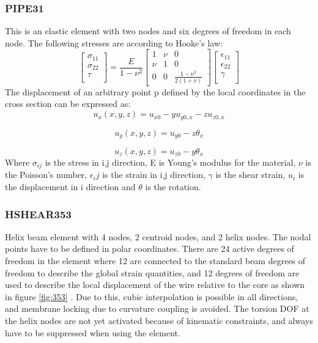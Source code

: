 \subsubsection{PIPE31}
This is an elastic element with two nodes and six degrees of freedom in each node. The following stresses are according to Hooke's law:
\begin{equation}
    \begin{bmatrix}
       \sigma_{11}\\[0.3em]
       \sigma_{22}\\[0.3em]
        \tau\\[0.3em]
     \end{bmatrix}= \frac{E}{1-\nu^2}  \begin{bmatrix}
       1 & \nu & 0           \\[0.3em]
       \nu & 1      & 0 \\[0.3em]
       0           & 0& \frac{1-\nu^2}{2(1+\nu)}
     \end{bmatrix} \begin{bmatrix}
       \epsilon_{11}\\[0.3em]
       \epsilon_{22}\\[0.3em]
        \gamma\\[0.3em]
     \end{bmatrix}
\end{equation}
The displacement of an arbitrary point p defined by the local coordinates in the cross section can be expressed as:
\begin{equation}
    u_x(x,y,z)=u_{x0}-yu_{y0,x}-zu_{z0,x}
\end{equation}

\begin{equation}
    u_y(x,y,z)=u_{y0}-z\theta_x
\end{equation}

\begin{equation}
    u_z(x,y,z)=u_{z0}-y\theta_x
\end{equation}
\noindent Where $\sigma_{ij}$ is the stress in i,j direction, E is Young's modulus for the material, $\nu$ is the Poisson's number, $\epsilon_ij$ is the strain in i,j direction, $\gamma$ is the shear strain, $u_i$ is the displacement in i direction and $\theta$ is the rotation.  
\subsubsection{HSHEAR353}
Helix beam element with 4 nodes, 2 centroid nodes, and 2 helix nodes. The nodal points have to be defined in polar coordinates. There are 24 active degrees of freedom in the element where 12 are connected to the standard beam degrees of freedom to describe the global strain quantities, and 12 degrees of freedom are used to describe the local displacement of the wire relative to the core as shown in figure \ref{fig:353} . Due to this, cubic interpolation is possible in all directions, and membrane locking due to curvature coupling is avoided. The torsion DOF at the helix nodes are not yet activated because of kinematic constraints, and always have to be suppressed when using the element.

